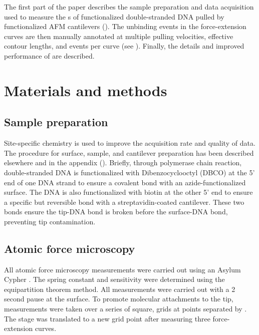 The first part of the paper describes the sample preparation and data acquisition used to measure the \fec{}s of functionalized double-stranded DNA pulled by functionalized AFM cantilevers ().  The unbinding events in the force-extension curves are then manually annotated at multiple pulling velocities, effective contour lengths, and events per curve (see ). Finally, the details and improved performance of \name{} are described. 

\chapter{Materials and methods}

\section{Sample preparation}

Site-specific chemistry is used to improve the acquisition rate and quality of data. The procedure for surface, sample, and cantilever preparation has been described elsewhere\cite{walder_robert_rapid_nodate} and in the appendix (). Briefly, through polymerase chain reaction, double-stranded DNA is functionalized with Dibenzocyclooctyl (DBCO) at the 5' end of one DNA strand to ensure a covalent bond with an azide-functionalized surface. The DNA is also functionalized with biotin at the other 5' end to ensure a specific but reversible bond with a streptavidin-coated cantilever. These two bonds ensure the tip-DNA bond is broken before the surface-DNA bond, preventing tip contamination. 

\section{Atomic force microscopy}

All atomic force microscopy measurements were carried out using an Asylum Cypher . The spring constant and sensitivity were determined using the equipartition theorem method. All measurements were carried out with a 2 second pause at the surface. To promote molecular attachments to the tip, measurements were taken over a series of square,  grids at points separated by . The stage was translated to a new grid point after measuring three force-extension curves. 

